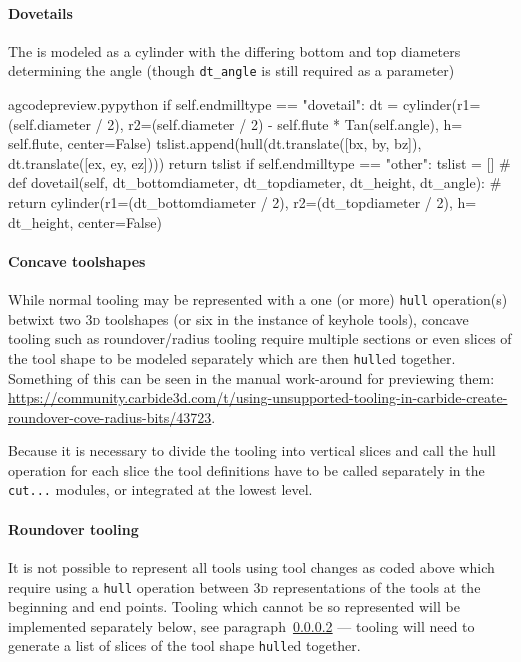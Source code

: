 \documentclass{ltxdoc}
\begin{document}
\paragraph{Dovetails}

\label{subpara:dovetails}The  is modeled as a cylinder with the differing bottom and top diameters determining the angle (though \verb|dt_angle| is still required as a parameter)

\lstset{firstnumber=\thegcpy}
\begin{writecode}{a}{gcodepreview.py}{python}
        if self.endmilltype == "dovetail":
            dt = cylinder(r1=(self.diameter / 2), r2=(self.diameter / 2) - self.flute * Tan(self.angle), h= self.flute, center=False)
            tslist.append(hull(dt.translate([bx, by, bz]), dt.translate([ex, ey, ez])))
            return tslist
        if self.endmilltype == "other":
            tslist = []
#    def dovetail(self, dt_bottomdiameter, dt_topdiameter, dt_height, dt_angle):
#        return cylinder(r1=(dt_bottomdiameter / 2), r2=(dt_topdiameter / 2), h= dt_height, center=False)

\end{writecode}
\addtocounter{gcpy}{9}


\paragraph{Concave toolshapes}
\label{para:concavetoolshapes} 
While normal tooling may be represented with a one (or more) \texttt{hull} operation(s) betwixt two \textsc{3d} toolshapes (or six in the instance of keyhole tools), concave tooling such as roundover/radius tooling require multiple sections or even slices of the tool shape to be modeled separately which are then \texttt{hull}ed together. Something of this can be seen in the manual work-around for previewing them: \url{https://community.carbide3d.com/t/using-unsupported-tooling-in-carbide-create-roundover-cove-radius-bits/43723}.

Because it is necessary to divide the tooling into vertical slices and call the hull operation for each slice the tool definitions have to be called separately in the \verb|cut...| modules, or integrated at the lowest level.

\paragraph{Roundover tooling}

\label{para:roundover} It is not possible to represent all tools using tool changes as coded above which require using a \texttt{hull} operation between \textsc{3d} representations of the tools at the beginning and end points. Tooling which cannot be so represented will be implemented separately below, see paragraph~\ref{para:concavetoolshapes} ---  tooling will need to generate a list of slices of the tool shape \verb|hull|ed together.
\end{document}

